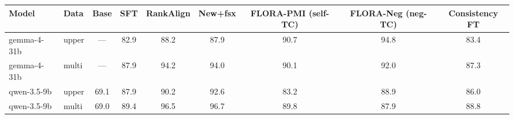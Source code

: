 \begin{tabular}{llccccccc}
\toprule
Model & Data & Base & SFT & RankAlign & New+fsx & FLORA-PMI (self-TC) & FLORA-Neg (neg-TC) & Consistency FT \\
\midrule
gemma-4-31b & upper & --- & 82.9 & 88.2 & 87.9 & 90.7 & 94.8 & 83.4 \\
gemma-4-31b & multi & --- & 87.9 & 94.2 & 94.0 & 90.1 & 92.0 & 87.3 \\
\midrule
qwen-3.5-9b & upper & 69.1 & 87.9 & 90.2 & 92.6 & 83.2 & 88.9 & 86.0 \\
qwen-3.5-9b & multi & 69.0 & 89.4 & 96.5 & 96.7 & 89.8 & 87.9 & 88.8 \\
\bottomrule
\end{tabular}
